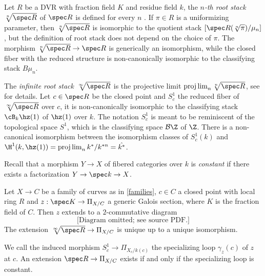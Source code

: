 
Let $R$ be a DVR with fraction field $K$ and residue field $k$, the \emph{$n$-th root stack} $\sqrt[n]{\spec R}$ of $\spec R$ is defined for every $n$ \cite[Appendix B]{agv08}. If $\pi\in R$ is a uniformizing parameter, then $\sqrt[n]{\spec R}$ is isomorphic to the quotient stack $[\spec R(\sqrt[n]{\pi})/\mu_{n}]$, but the definition of root stack does not depend on the choice of $\pi$. The morphism $\sqrt[n]{\spec R}\to \spec R$ is generically an isomorphism, while the closed fiber with the reduced structure is non-canonically isomorphic to the classifying stack $B\mu_{n}$.

The \emph{infinite root stack} $\sqrt[\infty]{\spec R}$ is the projective limit $\projlim_{n}\sqrt[n]{\spec R}$, see \cite{tv18} for details. Let $c\in\spec R$ be the closed point and $S^{1}_{c}$ the reduced fiber of $\sqrt[\infty]{\spec R}$ over $c$, it is non-canonically isomorphic to the classifying stack $\cB_{k}\hz(1)$ of $\hz(1)$ over $k$. The notation $S^{1}_{c}$ is meant to be reminiscent of the topological space $S^{1}$, which is the classifying space $\mathcal{B}\Z$ of $\Z$. There is a non-canonical isomorphism between the isomorphism classes of $S^{1}_{c}(k)$ and $\H^{1}(k,\hz(1))=\projlim_{n}k^*/k^{*n}=\hat{k^*}$.

Recall that a morphism $Y\to X$ of fibered categories over $k$ is \emph{constant} if there exists a factorization $Y\to\spec k\to X$.

\begin{proposition}
\notready\label{prorootval}
	Let $X\to C$ be a family of curves as in \autoref{families}, $c\in C$ a closed point with local ring $R$ and $z:\spec K\to\Pi_{X/C}$ a generic Galois section, where $K$ is the fraction field of $C$. Then $z$ extends to a $2$-commutative diagram
	\[\text{[Diagram omitted; see source PDF.]}\]
	The extension $\sqrt[\infty]{\spec R}\to\Pi_{X/C}$ is unique up to a unique isomorphism.

	We call the induced morphism $S^{1}_{c}\to\Pi_{X_{c}/k(c)}$ the specializing loop $\gamma_{z}(c)$ of $z$ at $c$. An extension $\spec R\to\Pi_{X/C}$ exists if and only if the specializing loop is constant.
\end{proposition}

